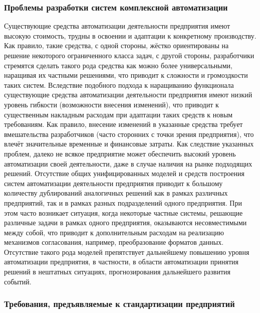 \subsubsection{Проблемы разработки систем комплексной автоматизации}

Существующие средства автоматизации деятельности предприятия имеют высокую стоимость, трудны в освоении и адаптации к конкретному производству. Как правило, такие средства, с одной стороны, жёстко ориентированы на решение некоторого ограниченного класса задач, с другой стороны, разработчики стремятся сделать такого рода средства как можно более универсальными, наращивая их частными решениями, что приводит к сложности и громоздкости таких систем. Вследствие подобного подхода к наращиванию функционала существующие средства автоматизации деятельности предприятия имеют низкий уровень гибкости (возможности внесения изменений), что приводит к существенным накладным расходам при адаптации таких средств к новым требованиям. Как правило, внесение изменений в указанные средства требует вмешательства разработчиков (часто сторонних с точки зрения предприятия), что влечёт значительные временные и финансовые затраты. Как следствие указанных проблем, далеко не всякое предприятие может обеспечить высокий уровень автоматизации своей деятельности, даже в случае наличия на рынке подходящих решений.
Отсутствие общих унифицированных моделей и средств построения систем автоматизации деятельности предприятия приводит к большому количеству дублирований аналогичных решений как в рамках различных предприятий, так и в рамках разных подразделений одного предприятия. При этом часто возникает ситуация, когда некоторые частные системы, решающие различные задачи в рамках одного предприятия, оказываются несовместимыми между собой, что приводит к дополнительным расходам на реализацию механизмов согласования, например, преобразование форматов данных. Отсутствие такого рода моделей препятствует дальнейшему повышению уровня автоматизации предприятия, в частности, в области автоматизации принятия решений в нештатных ситуациях, прогнозирования дальнейшего развития событий.

\subsubsection{Требования, предъявляемые к стандартизации предприятий}

